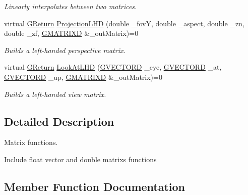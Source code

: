 \begin{DoxyCompactItemize}
\begin{DoxyCompactList}\small\item\em Linearly interpolates between two matrices. \end{DoxyCompactList}\item 
virtual \mbox{\hyperlink{namespace_g_w_a67a839e3df7ea8a5c5686613a7a3de21}{G\+Return}} \mbox{\hyperlink{class_g_w_1_1_m_a_t_h_1_1_g_matrix_ab22d0d332f4b1d2f1a1f52b2efeebabe}{Projection\+L\+HD}} (double \+\_\+fovY, double \+\_\+aspect, double \+\_\+zn, double \+\_\+zf, \mbox{\hyperlink{struct_g_w_1_1_m_a_t_h_1_1_g_m_a_t_r_i_x_d}{G\+M\+A\+T\+R\+I\+XD}} \&\+\_\+out\+Matrix)=0
\begin{DoxyCompactList}\small\item\em Builds a left-\/handed perspective matrix. \end{DoxyCompactList}\item 
virtual \mbox{\hyperlink{namespace_g_w_a67a839e3df7ea8a5c5686613a7a3de21}{G\+Return}} \mbox{\hyperlink{class_g_w_1_1_m_a_t_h_1_1_g_matrix_afa59696f30ec1fdaeb503df9b62e4ae2}{Look\+At\+L\+HD}} (\mbox{\hyperlink{struct_g_w_1_1_m_a_t_h_1_1_g_v_e_c_t_o_r_d}{G\+V\+E\+C\+T\+O\+RD}} \+\_\+eye, \mbox{\hyperlink{struct_g_w_1_1_m_a_t_h_1_1_g_v_e_c_t_o_r_d}{G\+V\+E\+C\+T\+O\+RD}} \+\_\+at, \mbox{\hyperlink{struct_g_w_1_1_m_a_t_h_1_1_g_v_e_c_t_o_r_d}{G\+V\+E\+C\+T\+O\+RD}} \+\_\+up, \mbox{\hyperlink{struct_g_w_1_1_m_a_t_h_1_1_g_m_a_t_r_i_x_d}{G\+M\+A\+T\+R\+I\+XD}} \&\+\_\+out\+Matrix)=0
\begin{DoxyCompactList}\small\item\em Builds a left-\/handed view matrix. \end{DoxyCompactList}\end{DoxyCompactItemize}


\subsection{Detailed Description}
Matrix functions. 

Include float vector and double matrix\textquotesingle{}s functions 

\subsection{Member Function Documentation}
\mbox{\label{class_g_w_1_1_m_a_t_h_1_1_g_matrix_a9ae855c7cfbfa08c84bd76a556302bc5}} 
